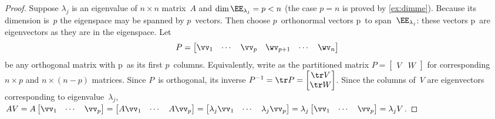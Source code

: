 \begin{proof} 
Suppose \(\lambda_j\) is an eigenvalue of \(n\times n\) matrix~\(A\) and \(\dim\EE_{\lambda_j}=p<n\) (the case \(p=n\) is proved by \autoref{ex:dimme}).
Because its dimension is~\(p\) the eigenspace may be spanned by \(p\)~vectors.
Then choose \(p\)~orthonormal vectors \hlist\vv p\ to span~\(\EE_{\lambda_j}\): these vectors \hlist\vv p\ are eigenvectors as they are in the eigenspace.
Let
\begin{equation*}
P=\begin{bmatrix} \vv_1&\cdots&\vv_p&\wv_{p+1}&\cdots&\wv_n \end{bmatrix}
\end{equation*}
be any orthogonal matrix with \hlist\vv p\ as its first \(p\)~columns.
Equivalently, write as the partitioned matrix \(P=\begin{bmatrix} V&W \end{bmatrix}\) for corresponding \(n\times p\) and \(n\times(n-p)\) matrices.
Since \(P\)~is orthogonal, its inverse \(P^{-1}=\tr P=\begin{bmatrix} \tr V\\\tr W \end{bmatrix}\).
Since the columns of~\(V\) are eigenvectors corresponding to eigenvalue~\(\lambda_j\), \(AV=A\begin{bmatrix} \vv_1&\cdots&\vv_p \end{bmatrix}
=\begin{bmatrix} A\vv_1&\cdots&A\vv_p \end{bmatrix}
=\begin{bmatrix} \lambda_j\vv_1&\cdots&\lambda_j\vv_p \end{bmatrix}
=\lambda_j\begin{bmatrix} \vv_1&\cdots&\vv_p \end{bmatrix}
=\lambda_jV\).


\end{proof}
